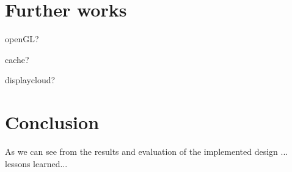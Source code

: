 \documentclass[12pt, a4paper, oneside]{article}
\begin{document}
\section{Further works}
openGL?

cache?

displaycloud?

\newpage
\section{Conclusion}
As we can see from the results and evaluation of the implemented design ...
lessons learned...

\newpage




\end{document}
